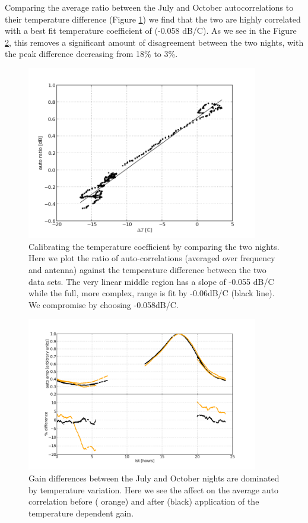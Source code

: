 \documentclass[preprint]{aastex}
\begin{document}
Comparing the average ratio between the July and October autocorrelations to their temperature difference (Figure \ref{fig:autos_tempcorr}) we find that the two are highly correlated  with 
a best fit temperature coefficient of (-0.058 dB/C). As we see in the Figure \ref{fig:auto_compare}, this removes a significant amount of disagreement between the two nights, 
with the peak difference decreasing from 18\% to 3\%.
\begin{figure}
\includegraphics[width=0.9\textwidth]{plots/auto_tempcorr.png}
\caption{Calibrating the temperature coefficient by comparing the two nights.  Here we plot the ratio of auto-correlations (averaged over frequency and antenna) against the temperature difference between the two data sets. The very linear middle region has a slope of  -0.055 dB/C while the full, more complex, range is fit by -0.06dB/C (black line).  We compromise by choosing -0.058dB/C.   \label{fig:autos_tempcorr}}
\end{figure}
\begin{figure}
\includegraphics[width=0.9\textwidth]{plots/auto_balance.png}
\caption{Gain differences between the July and October nights are dominated by temperature variation. Here we see the affect on 
the average auto correlation before ({\color{orange} orange}) and after (black) application of the temperature dependent gain. \label{fig:auto_compare}}
\end{figure}
\end{document}
